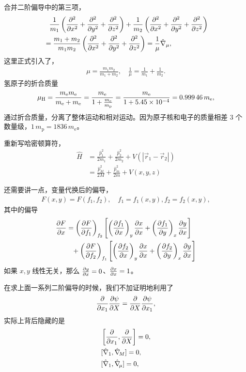 合并二阶偏导中的第三项，
\begin{align}
    &\phantom{=}\frac1{m_1} \left(\pdv[2]x + \pdv[2]y + \pdv[2]z\right) +
    \frac1{m_2} \left(\pdv[2]x + \pdv[2]y + \pdv[2]z\right) \\
    &= \frac{m_1 + m_2}{m_1 m_2} \left(
        \pdv[2]x + \pdv[2]y + \pdv[2]z
    \right) = \frac{1}{\mu} \hat \nabla_\mu,
\end{align}
这里正式引入了，
\begin{align}
    \mu = \frac{m_1m_2}{m_1 + m_2}, \quad \frac1{\mu}=\frac1{m_1} + \frac1{m_2}. 
\end{align}
氢原子的折合质量
\begin{align}
    \mu_{\mathrm H} = \frac{m_{\mathrm e} m_{\mathrm e}}{m_{\mathrm e}+m_{\mathrm e}} = \frac {m_{\mathrm e}} {1 + \frac{m_{\mathrm e}}{m_{\mathrm p}}} = \frac{m_{\mathrm e}}{1 + \num{5.45E-4}} = \num{0.99946} \,m_{\mathrm e}, 
\end{align}
通过折合质量，分离了整体运动和相对运动。因为原子核和电子的质量相差 3 个数量级，$1 \,m_{\mathrm p} = 1836 \,m_{\mathrm e}$。

重新写哈密顿算符，
\begin{align}
    \hat H &= \frac{\hat p_1^2}{2m_1} + \frac{\hat p_2^2}{2m_2} + V (|\vec r_1 - \vec r_2 |) \\
    &= \frac{\hat p_M^2}{2M} + \frac{\hat p_m^2}{2m} + V(x,y,z)
    \label{eq:hydro_cent_h}
\end{align}

还需要讲一点，变量代换后的偏导，
\begin{align}
    F(x,y) = F(f_1,f_2), \quad f_1=f_1(x,y), f_2=f_2(x,y),
\end{align}
其中的偏导
\begin{align}
    \pdv{F}{x} &= \left(\pdv{F}{f_1}\right)_{f_2} 
    \left[
        \left(\pdv{f_1}{x}\right)_y \pdv{x}{x}
        + \left(\pdv{f_1}{y}\right)_x \pdv{y}{x}
    \right] \notag\\
    &\phantom{=}
    +
    \left(\pdv{F}{f_2}\right)_{f_1}
    \left[
        \left(\pdv{f_2}{x}\right)_y \pdv{x}{x}
        + \left(\pdv{f_2}{y}\right)_x \pdv{y}{x}
    \right] 
\end{align}
如果 $x,y$ 线性无关，那么 $\pdv{y}{x} = 0$、$\pdv{x}{x} = 1$。

在求上面一系列二阶偏导的时候，我们不加证明地利用了
\begin{align}
    \pdv{x_1} \pdv{\psi}{X} = \pdv{X} \pdv{\psi}{x_1},
\end{align}
实际上背后隐藏的是
\begin{align}
    &\left[
        \pdv{x_1}, \pdv{X}
    \right] = 0, \\
    & [\hat \nabla _1, \hat \nabla\! _M] = 0,\\
    &[\hat \nabla_1, \hat \nabla\!_\mu] = 0,
\end{align}

